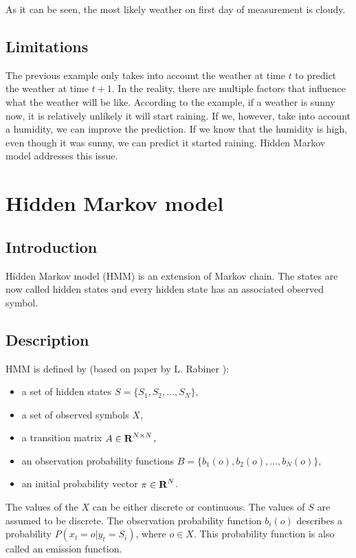 \documentclass[thesis=B,english]{FITthesis}[2012/06/26]
\begin{document}
As it can be seen, the most likely weather on first day of measurement is cloudy.

\subsection{Limitations}

The previous example only takes into account the weather at time $t$ to predict the weather at time $t+1$. In the reality, there are multiple factors that influence what the weather will be like. According to the example, if a weather is sunny now, it is relatively unlikely it will start raining. If we, however, take into account a humidity, we can improve the prediction. If we know that the humidity is high, even though it was sunny, we can predict it started raining. Hidden Markov model addresses this issue.

\section{Hidden Markov model}

\subsection{Introduction}

Hidden Markov model (HMM) is an extension of Markov chain. The states are now called hidden states and every hidden state has an associated observed symbol.

\subsection{Description}

HMM is defined by (based on paper by L. Rabiner \cite{hmm-lawrence}):
\begin{itemize}

\item a set of hidden states $S = \{S_1, S_2, \dots, S_N\}$,
\item a set of observed symbols $X$,
\item a transition matrix $A \in \textbf R^{N \times N}$,
\item an observation probability functions $B = \{b_1(o), b_2(o), \dots, b_N(o)\}$,
\item an initial probability vector $\pi \in \textbf R^N$.

\end{itemize}

The values of the $X$ can be either discrete or continuous. The values of $S$ are assumed to be discrete. The observation probability function $b_i(o)$ describes a probability $P(x_t = o | y_t = S_i)$, where $o \in X$. This probability function is also called an emission function.
\end{document}

